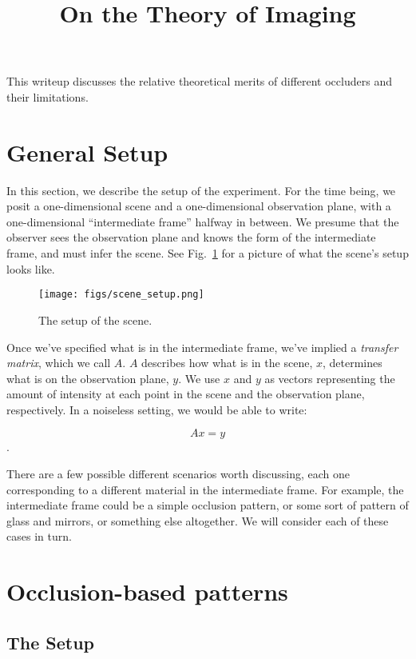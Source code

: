 \documentclass[11pt]{article}
\title{On the Theory of Imaging}
\begin{document}
\maketitle

This writeup discusses the relative theoretical merits of different occluders and their limitations.

\section{General Setup}

In this section, we describe the setup of the experiment. For the time being, we posit a one-dimensional scene and a one-dimensional observation plane, with a one-dimensional ``intermediate frame'' halfway in between. We presume that the observer sees the observation plane and knows the form of the intermediate frame, and must infer the scene. See Fig.~\ref{fig:scene_setup} for a picture of what the scene's setup looks like.

\begin{figure}
\centering
\texttt{[image: figs/scene\_setup.png]}
\caption{The setup of the scene.}
\label{fig:scene_setup}
\end{figure}

Once we've specified what is in the intermediate frame, we've implied a \emph{transfer matrix}, which we call $A$. $A$ describes how what is in the scene, $x$, determines what is on the observation plane, $y$. We use $x$ and $y$ as vectors representing the amount of intensity at each point in the scene and the observation plane, respectively. In a noiseless setting, we would be able to write:

$$Ax = y$$.

There are a few possible different scenarios worth discussing, each one corresponding to a different material in the intermediate frame. For example, the intermediate frame could be a simple occlusion pattern, or some sort of pattern of glass and mirrors, or something else altogether. We will consider each of these cases in turn. 

\section{Occlusion-based patterns}

\subsection{The Setup}
\end{document}
